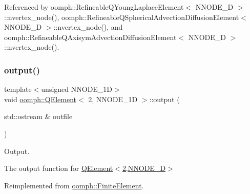 Referenced by oomph\+::\+Refineable\+Q\+Young\+Laplace\+Element$<$ N\+N\+O\+D\+E\+\_\+D $>$\+::nvertex\+\_\+node(), oomph\+::\+Refineable\+Q\+Spherical\+Advection\+Diffusion\+Element$<$ N\+N\+O\+D\+E\+\_\+D $>$\+::nvertex\+\_\+node(), and oomph\+::\+Refineable\+Q\+Axisym\+Advection\+Diffusion\+Element$<$ N\+N\+O\+D\+E\+\_\+D $>$\+::nvertex\+\_\+node().

\mbox{\label{classoomph_1_1QElement_3_012_00_01NNODE__1D_01_4_ab7bb815a43598e7ce0c4d10c511504fc}} 
\subsubsection{\texorpdfstring{output()}{output()}\hspace{0.1cm}{\footnotesize\ttfamily [1/4]}}
{\footnotesize\ttfamily template$<$unsigned N\+N\+O\+D\+E\+\_\+1D$>$ \\
void \hyperlink{classoomph_1_1QElement}{oomph\+::\+Q\+Element}$<$ 2, N\+N\+O\+D\+E\+\_\+1D $>$\+::output (\begin{DoxyParamCaption}\item[{std\+::ostream \&}]{outfile }\end{DoxyParamCaption})\hspace{0.3cm}{\ttfamily [virtual]}}



Output. 

The output function for \hyperlink{classoomph_1_1QElement_3_012_00_01NNODE__1D_01_4}{Q\+Element$<$2,\+N\+N\+O\+D\+E\+\_\+D$>$} 

Reimplemented from \hyperlink{classoomph_1_1FiniteElement_a2ad98a3d2ef4999f1bef62c0ff13f2a7}{oomph\+::\+Finite\+Element}.



